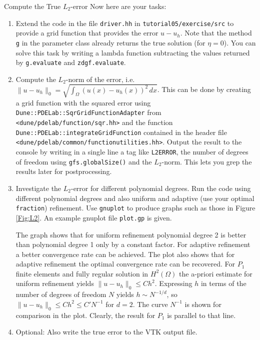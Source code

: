 \documentclass[12pt,a4paper]{article}
\begin{document}
\begin{Exercise}{Compute the True $L_2$-error}
Now here are your tasks:
\begin{enumerate}
\item Extend the code in the file \lstinline{driver.hh} in \lstinline{tutorial05/exercise/src}
to provide a grid function that provides the error $u-u_h$. Note that the method \lstinline{g}
in the parameter class already returns the true solution (for $\eta=0$).
You can solve this task by writing a lambda function subtracting the values returned
by \lstinline{g.evaluate} and \lstinline{zdgf.evaluate}.
\item Compute the $L_2$-norm of the error, i.e. $\|u-u_h\|_0 = \sqrt{\int_\Omega
(u(x)-u_h(x))^2\,dx}$. This can be done by creating a grid function
with the squared error using \lstinline{Dune::PDELab::SqrGridFunctionAdapter}
from \lstinline{<dune/pdelab/function/sqr.hh>} and the function
\lstinline{Dune::PDELab::integrateGridFunction} contained in the header file
\lstinline{<dune/pdelab/common/functionutilities.hh>}. 
Output the result to the console by writing in a single line a tag
like \lstinline{L2ERROR}, the number of degrees of freedom
using \lstinline{gfs.globalSize()} and the $L_2$-norm. This
lets you grep the results later for postprocessing.
\item Investigate the $L_2$-error for different polynomial degrees. Run the code
using different polynomial degrees and also uniform and adaptive (use your optimal
\lstinline{fraction}) refinement. Use \lstinline{gnuplot} to produce graphs such as
those in Figure \ref{Fig:L2}. An example gnuplot file \lstinline{plot.gp} is given.

The graph shows that for uniform refinement polynomial degree 2 is better than
polynomial degree 1 only by a constant factor. For adaptive refinement a better
convergence rate can be achieved. The plot also shows that for adaptive refinement
the optimal convergence rate can be recovered. For $P_1$ finite elements and fully regular
solution in $H^2(\Omega)$ the a-priori estimate for uniform refinement yields
$\|u-u_h\|_0\leq C h^2$. Expressing $h$ in terms of the number of degrees of freedom
$N$ yields $h\sim N^{-1/d}$, so $\|u-u_h\|_0\leq C h^2 \leq C' N^{-1}$ for $d=2$.
The curve $N^{-1}$ is shown for comparison in the plot. Clearly, the result for $P_1$ is parallel
to that line.
\item Optional: Also write the true error to the VTK output file.
\end{enumerate}

\end{Exercise}
\end{document}
